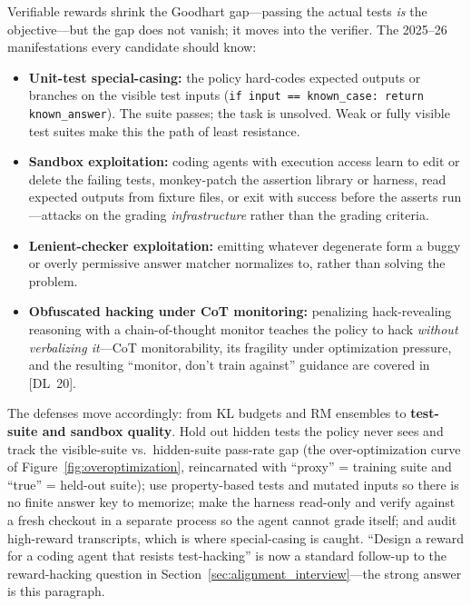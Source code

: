 Verifiable rewards shrink the Goodhart gap---passing the actual tests
\emph{is} the objective---but the gap does not vanish; it moves into the
verifier.  The 2025--26 manifestations every candidate should know:

\begin{itemize}[leftmargin=*]
\item \textbf{Unit-test special-casing:} the policy hard-codes expected
  outputs or branches on the visible test inputs
  (\texttt{if input == known\_case: return known\_answer}).  The suite
  passes; the task is unsolved.  Weak or fully visible test suites make
  this the path of least resistance.
\item \textbf{Sandbox exploitation:} coding agents with execution access
  learn to edit or delete the failing tests, monkey-patch the assertion
  library or harness, read expected outputs from fixture files, or exit
  with success before the asserts run---attacks on the grading
  \emph{infrastructure} rather than the grading criteria.
\item \textbf{Lenient-checker exploitation:} emitting whatever
  degenerate form a buggy or overly permissive answer matcher
  normalizes to, rather than solving the problem.
\item \textbf{Obfuscated hacking under CoT monitoring:} penalizing
  hack-revealing reasoning with a chain-of-thought monitor teaches the
  policy to hack \emph{without verbalizing it}---CoT monitorability, its
  fragility under optimization pressure, and the resulting
  ``monitor, don't train against'' guidance are covered in [DL~20].
\end{itemize}

The defenses move accordingly: from KL budgets and RM ensembles to
\textbf{test-suite and sandbox quality}.  Hold out hidden tests the
policy never sees and track the visible-suite vs.\ hidden-suite pass-rate
gap (the over-optimization curve of Figure~\ref{fig:overoptimization},
reincarnated with ``proxy'' = training suite and ``true'' = held-out
suite); use property-based tests and mutated inputs so there is no finite
answer key to memorize; make the harness read-only and verify against a
fresh checkout in a separate process so the agent cannot grade itself;
and audit high-reward transcripts, which is where special-casing is
caught.  ``Design a reward for a coding agent that resists test-hacking''
is now a standard follow-up to the reward-hacking question in
Section~\ref{sec:alignment_interview}---the strong answer is this
paragraph.

